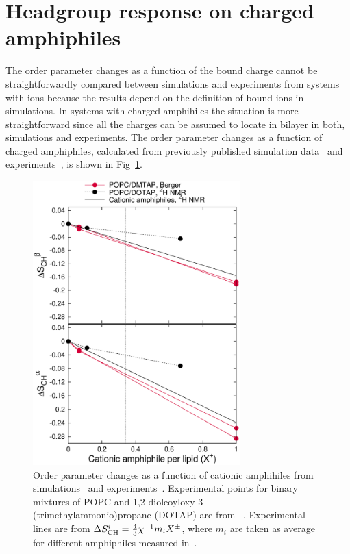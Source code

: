 \documentclass[twoside,twocolumn,9pt]{article}
\begin{document}
\section{Headgroup response on charged amphiphiles}
The order parameter changes as a function of the bound charge cannot be straightforwardly
compared between simulations and experiments from systems with ions because the 
results depend on the definition of bound ions in simulations. In systems with charged
amphihiles the situation is more straightforward since all the charges can be assumed 
to locate in bilayer in both, simulations and experiments. The order parameter changes as a 
function of charged amphiphiles, calculated from previously published simulation 
data~\cite{miettinen09,DMPC_DMTAP0mol,DMPC_DMTAP6mol,DMPC_DMTAP50mol} and
experiments~\cite{scherer89,franzin98}, is shown in Fig~\ref{DMPC_DMTAP}.
\begin{figure}[]
  \centering
  \includegraphics[width=8cm]{../Fig/OrderParameterDMPC_DMTAP.eps} 
  \caption{\label{DMPC_DMTAP}
    Order parameter changes as a function of cationic amphihiles from simulations~\cite{miettinen09,DMPC_DMTAP0mol,DMPC_DMTAP6mol,DMPC_DMTAP50mol} 
    and experiments~\cite{scherer89,franzin98}. Experimental points for binary mixtures of POPC and 1,2-dioleoyloxy-3-(trimethylammonio)propane (DOTAP)
    are from ~\cite{franzin98}. Experimental lines are from $\Delta S_{\rm{CH}}^{i}=\frac{4}{3}\chi^{-1}m_i X^\pm$, where $m_i$ are taken as average
    for different amphiphiles measured in~\cite{scherer89}.
}
\end{figure}
\end{document}
